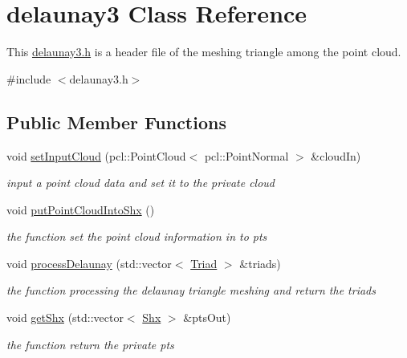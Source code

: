 \hypertarget{classdelaunay3}{}\section{delaunay3 Class Reference}
\label{classdelaunay3}


This \hyperlink{delaunay3_8h}{delaunay3.\+h} is a header file of the meshing triangle among the point cloud.  




{\ttfamily \#include $<$delaunay3.\+h$>$}

\subsection*{Public Member Functions}
\begin{DoxyCompactItemize}
\item 
void \hyperlink{classdelaunay3_ad471ec1146aff4415b29ab0d1a6f429e}{set\+Input\+Cloud} (pcl\+::\+Point\+Cloud$<$ pcl\+::\+Point\+Normal $>$ \&cloud\+In)
\begin{DoxyCompactList}\small\item\em input a point cloud data and set it to the private cloud \end{DoxyCompactList}\item 
void \hyperlink{classdelaunay3_a1fdbb109ed42bfb672392cc2f39d6a3f}{put\+Point\+Cloud\+Into\+Shx} ()
\begin{DoxyCompactList}\small\item\em the function set the point cloud information in to pts \end{DoxyCompactList}\item 
void \hyperlink{classdelaunay3_af591f1401bf4b3c3a85f749b6d0cf831}{process\+Delaunay} (std\+::vector$<$ \hyperlink{structTriad}{Triad} $>$ \&triads)
\begin{DoxyCompactList}\small\item\em the function processing the delaunay triangle meshing and return the triads \end{DoxyCompactList}\item 
void \hyperlink{classdelaunay3_a1732c03a4e19398bf68ed3a9edbb3f42}{get\+Shx} (std\+::vector$<$ \hyperlink{structShx}{Shx} $>$ \&pts\+Out)
\begin{DoxyCompactList}\small\item\em the function return the private pts \end{DoxyCompactList}\end{DoxyCompactItemize}


